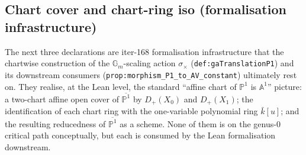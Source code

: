 \subsection*{Chart cover and chart-ring iso (formalisation infrastructure)}
The next three declarations are iter-168 formalisation infrastructure that the chartwise
construction of the \(\mathbb G_m\)-scaling action \(\sigma_\times\) (\texttt{def:gaTranslationP1})
and its downstream consumers (\texttt{prop:morphism_P1_to_AV_constant}) ultimately rest on.
They realise, at the Lean level, the standard ``affine chart of \(\mathbb P^1\) is \(\mathbb
A^1\)'' picture: a two-chart affine open cover of \(\overline{\mathbb P^1}\) by \(D_+(X_0)\) and
\(D_+(X_1)\); the identification of each chart ring with the one-variable polynomial ring
\(\bar k[u]\); and the resulting reducedness of \(\overline{\mathbb P^1}\) as a scheme. None
of them is on the genus-\(0\) critical path conceptually, but each is consumed by the Lean
formalisation downstream.
